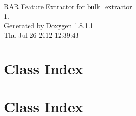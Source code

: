 \documentclass{book}
\begin{document}
\hypersetup{pageanchor=false,citecolor=blue}
\begin{titlepage}
\vspace*{7cm}
\begin{center}
{\Large R\-A\-R Feature Extractor for bulk\-\_\-extractor \\[1ex]\large 1. }\\
\vspace*{1cm}
{\large Generated by Doxygen 1.8.1.1}\\
\vspace*{0.5cm}
{\small Thu Jul 26 2012 12:39:43}\\
\end{center}
\end{titlepage}
\clearemptydoublepage
{}
\tableofcontents
\clearemptydoublepage
{}
\hypersetup{pageanchor=true,citecolor=blue}
\chapter{Class Index}

\chapter{Class Index}

\end{document}
